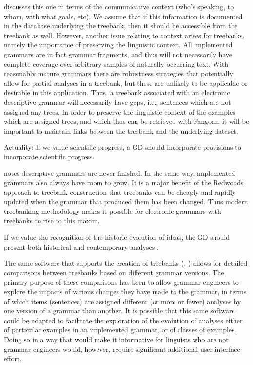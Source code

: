 \citeauthor{Nordhoff:08} discusses this one in terms of the communicative
context (who's speaking, to whom, with what goals, etc).  We assume that if this
information is documented in the database underlying the treebank, then it
should be accessible from the treebank as well.  However, another issue relating
to context arises for treebanks, namely the importance of preserving the
linguistic context.  All implemented grammars are in fact grammar fragments, and
thus will not necessarily have complete coverage over arbitrary samples of
naturally occurring text.  With reasonably mature grammars there are robustness
strategies \citep{Kie:Kri:Car:Mal:99,Rie:Kin:Cro:Max:Kap:02} that potentially allow for partial analyses
in a treebank, but these are unlikely to be applicable or desirable in this
application.  Thus, a treebank associated with an electronic descriptive grammar
will necessarily have gaps, i.e., sentences which are not assigned any trees. In
order to preserve the linguistic context of the examples which are assigned
trees, and which thus can be retrieved with Fangorn, it will be
important to maintain links between the treebank and the underlying dataset.

\begin{exe}
\ex\label{ex:act} {\sc Actuality:} If we value scientific progress, a
GD should incorporate provisions to incorporate scientific progress.
\end{exe}

\citeauthor{Nordhoff:08} notes descriptive grammars are never
finished.  In the same way, implemented grammars also always have room
to grow.  It is a major benefit of the Redwoods approach
to treebank construction \citep{Oep:Fli:Tou:04} that treebanks can be
cheaply and rapidly updated when the grammar that produced them has
been changed.  Thus modern treebanking methodology makes it possible
for electronic grammars with treebanks to rise to this maxim.

\begin{exe}
 If we value the recognition of the historic evolution
of ideas, the GD should present both historical and contemporary
analyses \cite[360]{Noonan:06}.
\end{exe}

The same software that supports the creation of treebanks
({\small\itsdb}, ) allows for detailed comparisons
between treebanks based on different grammar versions.  The primary
purpose of these comparisons has been to allow grammar engineers
to explore the impacts of various changes they have made to the
grammar, in terms of which items (sentences) are assigned different
(or more or fewer) analyses by one version of a grammar than 
another.  It is possible that this same software could be adapted
to facilitate the exploration of the evolution of analyses either of particular examples
in an implemented grammar, or of classes of examples.  Doing so in a way
that would make it informative for linguists who are not grammar
engineers would, however, require significant additional user interface
effort. 



